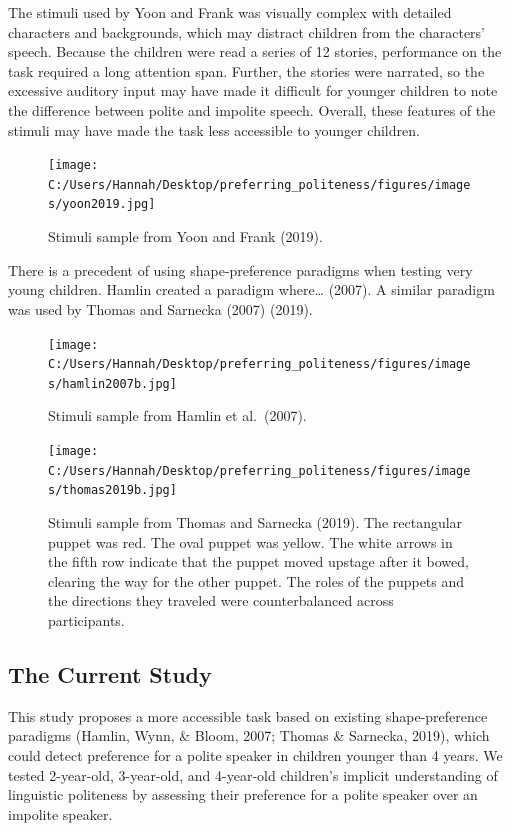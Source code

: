 \documentclass[
  english,
  man,floatsintext]{apa6}
\begin{document}
The stimuli used by Yoon and Frank was visually complex with detailed characters and backgrounds, which may distract children from the characters' speech. Because the children were read a series of 12 stories, performance on the task required a long attention span. Further, the stories were narrated, so the excessive auditory input may have made it difficult for younger children to note the difference between polite and impolite speech. Overall, these features of the stimuli may have made the task less accessible to younger children.

\begin{figure}
\centering
\texttt{[image: C:/Users/Hannah/Desktop/preferring\_politeness/figures/images/yoon2019.jpg]}
\caption{Stimuli sample from Yoon and Frank (2019).}
\end{figure}

There is a precedent of using shape-preference paradigms when testing very young children. Hamlin created a paradigm where\ldots{} (2007). A similar paradigm was used by Thomas and Sarnecka (2007) (2019).

\begin{figure}
\centering
\texttt{[image: C:/Users/Hannah/Desktop/preferring\_politeness/figures/images/hamlin2007b.jpg]}
\caption{Stimuli sample from Hamlin et al.~(2007).}
\end{figure}

\begin{figure}
\centering
\texttt{[image: C:/Users/Hannah/Desktop/preferring\_politeness/figures/images/thomas2019b.jpg]}
\caption{Stimuli sample from Thomas and Sarnecka (2019). The rectangular puppet was red. The oval puppet was yellow. The white arrows in the fifth row indicate that the puppet moved upstage after it bowed, clearing the way for the other puppet. The roles of the puppets and the directions they traveled were counterbalanced across participants.}
\end{figure}

\hypertarget{the-current-study}{%
\subsection{The Current Study}\label{the-current-study}}

This study proposes a more accessible task based on existing shape-preference paradigms (Hamlin, Wynn, \& Bloom, 2007; Thomas \& Sarnecka, 2019), which could detect preference for a polite speaker in children younger than 4 years. We tested 2-year-old, 3-year-old, and 4-year-old children's implicit understanding of linguistic politeness by assessing their preference for a polite speaker over an impolite speaker.
\end{document}
